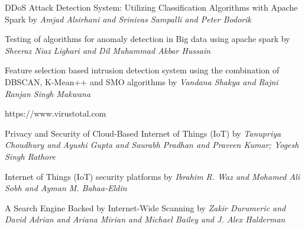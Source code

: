 \documentclass{report}
\begin{document}
\begin{thebibliography}{9}

DDoS Attack Detection System: Utilizing Classification Algorithms with Apache Spark by \textit{ Amjad Alsirhani and Srinivas Sampalli and Peter Bodorik}


Testing of algorithms for anomaly detection in Big data using apache spark by \textit{ Sheeraz Niaz Lighari and Dil Muhammad Akbar Hussain}

Feature selection based intrusion detection system using the combination of DBSCAN, K-Mean++ and SMO algorithms by \textit{ Vandana Shakya and Rajni Ranjan Singh Makwana}



https://www.virustotal.com



Privacy and Security of Cloud-Based Internet of Things (IoT) by \textit{ Tanupriya Choudhury and Ayushi Gupta and Saurabh Pradhan and Praveen Kumar; Yogesh Singh Rathore}

Internet of Things (IoT) security platforms by \textit{ Ibrahim R. Waz and Mohamed Ali Sobh and Ayman M. Bahaa-Eldin}

A Search Engine Backed by Internet-Wide Scanning by \textit{Zakir Durumeric and David Adrian and Ariana Mirian and  Michael Bailey and J. Alex Halderman}

\end{thebibliography}
\end{document}
